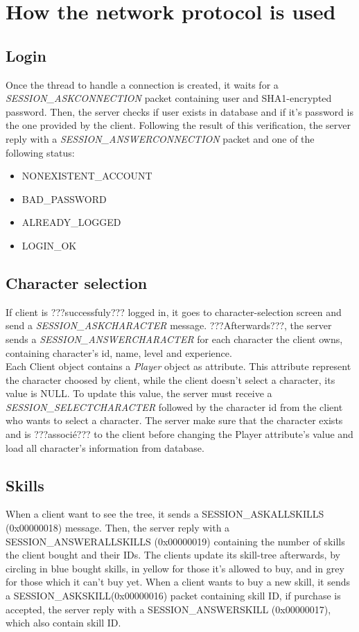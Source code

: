 \documentclass{scrreprt}
\begin{document}
				\section{How the network protocol is used}
				\subsection{Login}
				Once the thread to handle a connection is created, it waits for a \emph{SESSION\_ASKCONNECTION} packet containing user and SHA1-encrypted password. Then, the server checks if user exists in database and if it's password is the one provided by the client. Following the result of this verification, the server reply with a \emph{SESSION\_ANSWERCONNECTION} packet and one of the following status:
				\begin{itemize}
				\item{NONEXISTENT\_ACCOUNT}
				\item{BAD\_PASSWORD}
				\item{ALREADY\_LOGGED}
				\item{LOGIN\_OK}
				\end{itemize}

				\subsection{Character selection}
				If client is ???successfuly??? logged in, it goes to character-selection screen and send a \emph{SESSION\_ASKCHARACTER} message. ???Afterwards???, the server sends a \emph{SESSION\_ANSWERCHARACTER} for each character the client owns, containing character's id, name, level and experience.\\
					Each Client object contains a \emph{Player} object as attribute. This attribute represent the character choosed by client, while the client doesn't select a character, its value is NULL. To update this value, the server must receive a \emph{SESSION\_SELECTCHARACTER} followed by the character id from the client who wants to select a character. The server make sure that the character exists and is ???associé??? to the client before changing the Player attribute's value and load all character's information from database.

					\subsection{Skills}
					When a client want to see the tree, it sends a SESSION\_ASKALLSKILLS (0x00000018) message. Then, the server reply with a SESSION\_ANSWERALLSKILLS (0x00000019) containing the number of skills the client bought and their IDs. The clients update its skill-tree afterwards, by circling in blue bought skills, in yellow for those it's allowed to buy, and in grey for those which it can't buy yet.
					When a client wants to buy a new skill, it sends a SESSION\_ASKSKILL(0x00000016) packet containing skill ID, if purchase is accepted, the server reply with a SESSION\_ANSWERSKILL (0x00000017), which also contain skill ID.\\
\end{document}
